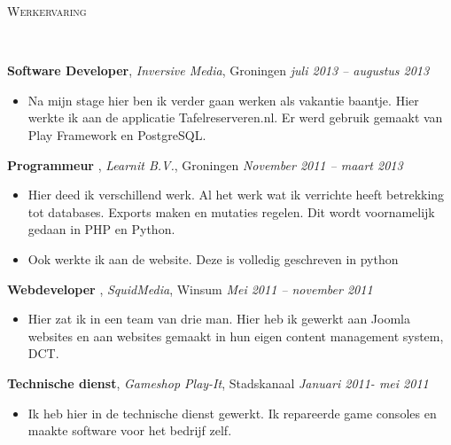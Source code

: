 \documentclass[9pt]{article}
\newenvironment{changemargin}[2]{%
  \begin{list}{}{%
    \setlength{\topsep}{0pt}%
    \setlength{\leftmargin}{#1}%
    \setlength{\rightmargin}{#2}%
    \setlength{\listparindent}{\parindent}%
    \setlength{\itemindent}{\parindent}%
    \setlength{\parsep}{\parskip}%
  }%
  \item[]}{\end{list}
}
\newcommand{\lineover}{
	\begin{changemargin}{-0.05in}{-0.05in}
		\vspace*{-8pt}
		\hrulefill \\
		\vspace*{-2pt}
	\end{changemargin}
}
\newcommand{\header}[1]{
	\begin{changemargin}{-0.5in}{-0.5in}
		\scshape{\niceHeadSmall#1}\\
  	\lineover
	\end{changemargin}
}
\newenvironment{body} {
	\vspace*{-16pt}
	\begin{changemargin}{-0.25in}{-0.5in}
  }	
	{\end{changemargin}
}
\begin{document}
\smallskip



\header{Werkervaring}

\begin{body}
	\vspace{14pt}

	\textbf{Software Developer}, \emph{Inversive Media}, Groningen \hfill \emph{juli 2013 -- augustus 2013}\\
	\vspace*{-4pt}
	\begin{itemize} \itemsep -0pt  %
		\item Na mijn stage hier ben ik verder gaan werken als vakantie baantje. Hier werkte ik aan de applicatie Tafelreserveren.nl. Er werd gebruik gemaakt van Play Framework en PostgreSQL.
	\end{itemize}

	\textbf{Programmeur }, \emph{Learnit B.V.}, Groningen \hfill \emph{November 2011 -- maart 2013}\\
	\vspace*{-4pt}
	\begin{itemize} \itemsep -0pt  %
		\item Hier deed ik verschillend werk. Al het werk wat ik verrichte heeft betrekking tot databases. Exports maken en mutaties regelen. Dit wordt voornamelijk gedaan in PHP en Python. 
		\item Ook werkte ik aan de website. Deze is volledig geschreven in python 
	\end{itemize}

	\textbf {Webdeveloper }, \emph{SquidMedia}, Winsum  \hfill \emph{Mei 2011 -- november 2011 }\\
	\vspace*{-4pt}
	\begin{itemize} \itemsep -0pt
		\item Hier zat ik in een team van drie man. Hier heb ik gewerkt aan Joomla websites en aan websites gemaakt in hun eigen content management system, DCT.
	\end{itemize}

	\textbf {Technische dienst}, \emph{Gameshop Play-It}, Stadskanaal   \hfill \emph{Januari 2011- mei 2011  }\\
	\vspace*{-4pt}
	\begin{itemize} \itemsep -0pt
		\item Ik heb hier in de technische dienst gewerkt. Ik repareerde game consoles en maakte software voor het bedrijf zelf.
	\end{itemize}


\end{body}
\end{document}
